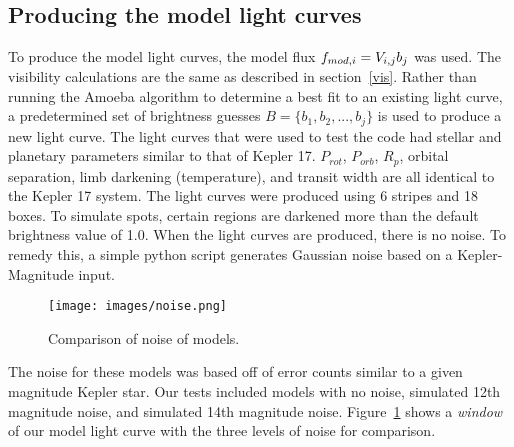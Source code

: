 

\subsection{Producing the model light curves \label{modelLC}}
To produce the model light curves, the model flux $\mbox{$f_{mod,i}$} = V_{i,j} b_j$ was used. The visibility calculations are the same as described in section~\ref{vis}. Rather than running the Amoeba algorithm to determine a best fit to an existing light curve, a predetermined set of brightness guesses $B = \{b_1, b_2, ..., b_j\}$ is used to produce a new light curve. The light curves that were used to test the code had stellar and planetary parameters similar to that of Kepler 17. $P_{rot}$, $P_{orb}$, $R_p$, orbital separation, limb darkening (temperature), and transit width are all identical to the Kepler 17 system. The light curves were produced using 6 stripes and 18 boxes. To simulate spots, certain regions are darkened more than the default brightness value of 1.0. When the light curves are produced, there is no noise. To remedy this, a simple python script generates Gaussian noise based on a Kepler-Magnitude input. 
\begin{figure}
	\centering
	\texttt{[image: images/noise.png]}
	\caption{Comparison of noise of models.}
	\label{noise_comp}
\end{figure}

The noise for these models was based off of error counts similar to a given magnitude Kepler star. Our tests included models with no noise, simulated 12th magnitude noise, and simulated 14th magnitude noise. Figure~\ref{noise_comp} shows a {\it window} of our model light curve with the three levels of noise for comparison.
